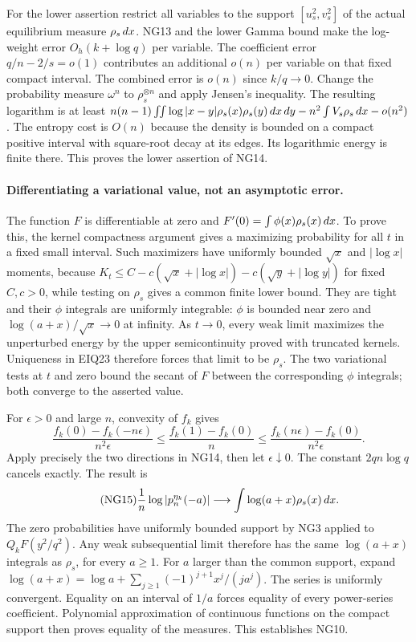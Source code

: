 \documentclass[11pt]{article}
\begin{document}
For the lower assertion restrict all variables to the support
$[u_s^2,v_s^2]$ of the actual equilibrium measure $\rho_s\,d x$.
NG13 and the lower Gamma bound make the log-weight error $O_h(k+\log q)$
per variable. The coefficient error $q/n-2/s=o(1)$ contributes an
additional $o(n)$ per variable on that fixed compact interval. The
combined error is $o(n)$ since $k/q\to0$.
Change the probability measure $\omega^n$ to $\rho_s^{\otimes n}$
and apply Jensen's inequality. The resulting logarithm is at least
$n(n-1)\iint\log|x-y|\rho_s(x)\rho_s(y)\,d x\,d y
-n^2\int V_s\rho_s\,d x-o(n^2)$.
The entropy cost is $O(n)$ because the density is bounded on a compact
positive interval with square-root decay at its edges. Its logarithmic
energy is finite there. This proves the lower assertion of NG14.

\paragraph{Differentiating a variational value, not an asymptotic error.}
The function $F$ is differentiable at zero and
$F'(0)=\int\phi(x)\rho_s(x)\,d x$.
To prove this, the kernel compactness argument gives a maximizing
probability for all $t$ in a fixed small interval. Such maximizers have
uniformly bounded $\sqrt x$ and $|\log x|$ moments, because
$K_t\le C-c(\sqrt x+|\log x|)-c(\sqrt y+|\log y|)$ for fixed
$C,c>0$, while testing on $\rho_s$ gives a common finite lower bound.
They are tight and their $\phi$ integrals are uniformly integrable:
$\phi$ is bounded near zero and $\log(a+x)/\sqrt x\to0$ at infinity.
As $t\to0$, every weak limit maximizes the unperturbed energy by the
upper semicontinuity proved with truncated kernels. Uniqueness in EIQ23
therefore forces that limit to be $\rho_s$. The two variational tests
at $t$ and zero bound the secant of $F$ between the corresponding
$\phi$ integrals; both converge to the asserted value.

For $\epsilon>0$ and large $n$, convexity of $f_k$ gives
\[
 \frac{f_k(0)-f_k(-n\epsilon)}{n^2\epsilon}
 \le\frac{f_k(1)-f_k(0)}n
 \le\frac{f_k(n\epsilon)-f_k(0)}{n^2\epsilon}.
\]
Apply precisely the two directions in NG14, then let $\epsilon\downarrow0$.
The constant $2qn\log q$ cancels exactly. The result is
\begin{equation}\tag{NG15}
 \frac1n\log|p_n^{\eta_k}(-a)|\longrightarrow
                     \int\log(a+x)\rho_s(x)\,d x.
\end{equation}
The zero probabilities have uniformly bounded support by NG3 applied
to $Q_kF(y^2/q^2)$. Any weak subsequential limit therefore has the
same $\log(a+x)$ integrals as $\rho_s$, for every $a\ge1$.
For $a$ larger than the common support, expand
$\log(a+x)=\log a+\sum_{j\ge1}(-1)^{j+1}x^j/(ja^j)$.
The series is uniformly convergent. Equality on an interval of $1/a$
forces equality of every power-series coefficient. Polynomial
approximation of continuous functions on the compact support then
proves equality of the measures. This establishes NG10.
\end{document}
